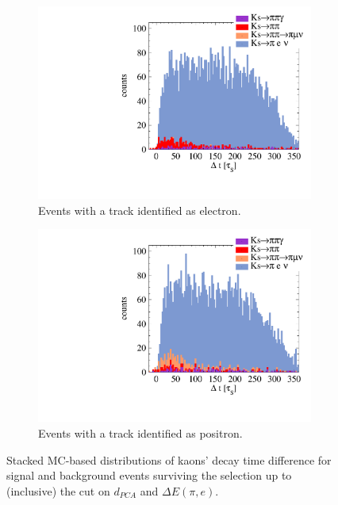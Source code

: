 \begin{figure}[h!]
  \captionsetup[subfigure]{justification=centering}
  \centering
  \begin{subfigure}{0.45\textwidth}
  \includegraphics[width=1.0\textwidth]{Chapter7_analysis_kloe/img/csps/with_bcg_eminus}
  \caption{Events with a track identified as electron.}
  \end{subfigure}
  \begin{subfigure}{0.45\textwidth}
  \includegraphics[width=1.0\textwidth]{Chapter7_analysis_kloe/img/csps/with_bcg_eplus}
  \caption{Events with a track identified as positron.}
  \end{subfigure}
  \caption{Stacked MC-based distributions of kaons' decay time difference for signal and background events surviving the selection up to (inclusive) the cut on $d_{PCA}$ and $\Delta E(\pi,e)$.}\label{fig:csps-dt-before}
\end{figure}


